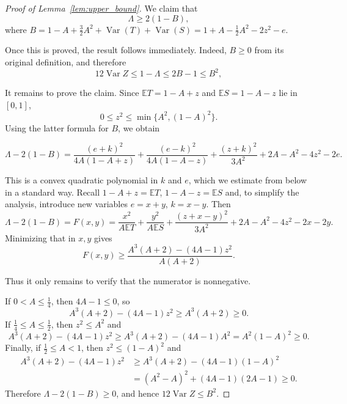 \documentclass[final,12pt]{elsarticle}
\numberwithin{equation}{section}
\theoremstyle{remark}
\newcommand{\E}{\mathbb E}
\newcommand{\Var}{\operatorname{Var}}
\theoremstyle{definition}
\begin{document}
\begin{proof}[Proof of Lemma~\ref{lem:upper_bound}]
We claim that
$$
 \Lambda\ge2(1-B),
$$
where $B=1-A+\frac{3}{2}A^2 + \Var(T) + \Var(S) = 1+A-\frac{1}{2}A^2-2z^2-e$.
\par Once this is proved, the result follows immediately. Indeed, $B\ge0$ from its original definition, and therefore
$$
 12\Var Z\le1-\Lambda\le2B-1\le B^2,
$$

It remains to prove the claim. Since
$\E T=1-A+z$ and $\E S=1-A-z$ lie in $[0,1]$,
$$
 0\le z^2\le\min\{A^2,(1-A)^2\}.
$$
Using the latter formula for $B$, we obtain

$$ \Lambda-2(1-B)
 ={}\frac{(e+k)^2}{4A(1-A+z)}
 +\frac{(e-k)^2}{4A(1-A-z)}
 +\frac{(z+k)^2}{3A^2}
 +2A-A^2-4z^2-2e.$$

This is a convex quadratic polynomial in $k$ and $e$, which we estimate from below in a standard way. Recall $1-A+z = \E T$, $1-A-z=\E S$ and, to simplify the analysis, introduce new variables $e=x+y$, $k=x-y$. Then
$$\Lambda-2(1-B) = F(x,y) = \frac{x^2}{A \E T} + \frac{y^2}{A \E S} + \frac{(z+x-y)^2}{3A^2} + 2A-A^2-4z^2-2x-2y.$$
Minimizing that in $x,y$ gives
$$F(x,y) \geq \frac{A^3(A+2)-(4A-1)z^2}{A(A+2)}.$$

%
%
%
%






Thus it only remains to verify that the numerator is nonnegative.






If $0<A\le\frac14$, then $4A-1\le0$, so $$A^3(A+2)-(4A-1)z^2\ge A^3(A+2) \geq 0.$$ If
$\frac14\le A\le\frac12$, then $z^2\le A^2$ and
$$
 A^3(A+2)-(4A-1)z^2\ge A^3(A+2)-(4A-1)A^2
 =A^2(1-A)^2\ge0.
$$
Finally, if $\frac12\le A<1$, then $z^2\le(1-A)^2$ and
$$
 \begin{aligned}
 A^3(A+2)-(4A-1)z^2&\ge A^3(A+2)-(4A-1)(1-A)^2\\
  &=(A^2-A)^2+(4A-1)(2A-1)\ge0.
 \end{aligned}
$$
Therefore $\Lambda-2(1-B)\ge0$, and hence $12\Var Z\le B^2$.

\end{proof}
\end{document}

